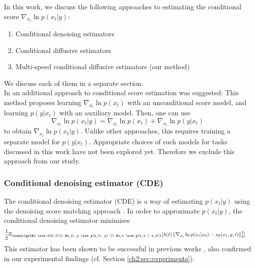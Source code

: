 In this work, we discuss the following approaches to estimating the conditional score $\nabla_{x_t} \ln p(x_t|y)$:
\begin{enumerate}
    \item Conditional denoising estimators
    \item Conditional diffusive estimators
    \item Multi-speed conditional diffusive estimators (our method)
\end{enumerate}
We discuss each of them in a separate section.\\

In \cite{song2021sde} an additional approach to conditional score estimation was suggested:
This method proposes learning $\nabla_{x_t} \ln p(x_t)$ with an unconditional score model, and  learning $p(y | x_t)$ with an auxiliary model. Then, one can use 
    \begin{equation*}
        \nabla_{x_t}\ln p(x_t |y) = \nabla_{x_t} \ln p(x_t) + \nabla_{x_t} \ln p(y | x_t)
    \end{equation*}
to obtain $\nabla_{x_t} \ln p(x_t | y)$. Unlike other approaches, this requires training a separate model for $p(y|x_t)$. Appropriate choices of such models for tasks discussed in this work have not been explored yet. Therefore we exclude this approach from our study. 

\subsubsection{Conditional denoising estimator (CDE)}
The conditional denoising estimator (CDE) is a way of estimating $p(x_t|y)$ using the denoising score matching approach \cite{vincent2011connection, song2020generative_score}. In order to approximate $p(x_t|y)$, the conditional denoising estimator minimises
\begin{gather}
\begin{aligned}
        \label{ch2:CDN}
        &\frac{1}{2} \mathbb{E}_{\subalign{&t \sim U(0,T)\\ &x_0, y \sim p(x_0, y) \\ &x_t \sim p(x_t | x_0)}} 
        [\lambda(t) \norm{\nabla_{x_t} \ln{p(x_t | x_0)} - s_\theta(x_t, y, t)}_2^2]
\end{aligned}
\end{gather}
This estimator has been shown to be successful in previous works \cite{saharia2021sr3,tashiro2021csdi}, also confirmed in our experimental findings (cf. Section \ref{ch2:sec:experiments}). 

